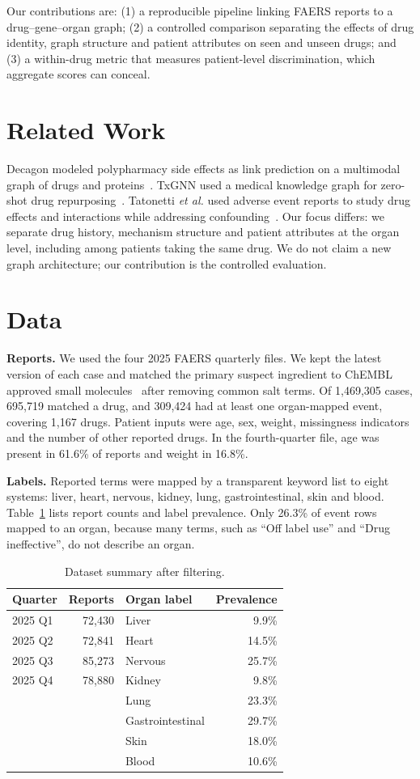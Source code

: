 \documentclass[conference,a4paper]{IEEEtran}
\begin{document}
Our contributions are: (1) a reproducible pipeline linking FAERS reports to a drug--gene--organ graph; (2) a controlled comparison separating the effects of drug identity, graph structure and patient attributes on seen and unseen drugs; and (3) a within-drug metric that measures patient-level discrimination, which aggregate scores can conceal.

\section{Related Work}
Decagon modeled polypharmacy side effects as link prediction on a multimodal graph of drugs and proteins~\cite{zitnik2018}. TxGNN used a medical knowledge graph for zero-shot drug repurposing~\cite{huang2024}. Tatonetti \emph{et al.} used adverse event reports to study drug effects and interactions while addressing confounding~\cite{tatonetti2012}. Our focus differs: we separate drug history, mechanism structure and patient attributes at the organ level, including among patients taking the same drug. We do not claim a new graph architecture; our contribution is the controlled evaluation.

\section{Data}
\textbf{Reports.} We used the four 2025 FAERS quarterly files. We kept the latest version of each case and matched the primary suspect ingredient to ChEMBL approved small molecules~\cite{zdrazil2024} after removing common salt terms. Of 1,469,305 cases, 695,719 matched a drug, and 309,424 had at least one organ-mapped event, covering 1,167 drugs. Patient inputs were age, sex, weight, missingness indicators and the number of other reported drugs. In the fourth-quarter file, age was present in 61.6\% of reports and weight in 16.8\%.

\textbf{Labels.} Reported terms were mapped by a transparent keyword list to eight systems: liver, heart, nervous, kidney, lung, gastrointestinal, skin and blood. Table~\ref{tab:data} lists report counts and label prevalence. Only 26.3\% of event rows mapped to an organ, because many terms, such as ``Off label use'' and ``Drug ineffective'', do not describe an organ.

\begin{table}[t]
\centering
\caption{Dataset summary after filtering.}
\label{tab:data}
\begin{tabular}{lrlr}
\toprule
Quarter & Reports & Organ label & Prevalence \\
\midrule
2025 Q1 & 72,430 & Liver & 9.9\% \\
2025 Q2 & 72,841 & Heart & 14.5\% \\
2025 Q3 & 85,273 & Nervous & 25.7\% \\
2025 Q4 & 78,880 & Kidney & 9.8\% \\
 & & Lung & 23.3\% \\
 & & Gastrointestinal & 29.7\% \\
 & & Skin & 18.0\% \\
 & & Blood & 10.6\% \\
\bottomrule
\end{tabular}
\end{table}
\end{document}
